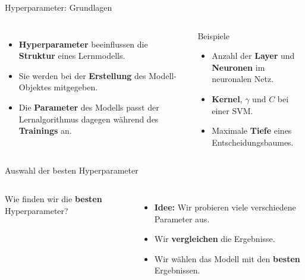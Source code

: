 

\begin{frame}{Hyperparameter: Grundlagen}
\begin{columns}
\begin{itemize}
  \item \textbf{Hyperparameter} beeinflussen die \textbf{Struktur} eines
        Lernmodells.
  \item Sie werden bei der \textbf{Erstellung} des Modell-Objektes
        mitgegeben.
  \item Die \textbf{Parameter} des Modells passt der Lernalgorithmus
        dagegen während des \textbf{Trainings} an.
\end{itemize}

\begin{blockC1}{Beispiele}
\begin{itemize}
  \item Anzahl der \textbf{Layer} und \textbf{Neuronen} im neuronalen Netz.
  \item \textbf{Kernel}, $\gamma$ und $C$ bei einer SVM.
  \item Maximale \textbf{Tiefe} eines Entscheidungsbaumes.
\end{itemize}
\end{blockC1}
\end{columns}
\end{frame}


\begin{frame}{Auswahl der besten Hyperparameter}
\begin{columns}
\centering
{}

Wie finden wir die \textbf{besten} Hyperparameter?

\vspace{0.4em}
\begin{itemize}
  \item \textbf{Idee:} Wir probieren viele verschiedene Parameter aus.
  \item Wir \textbf{vergleichen} die Ergebnisse.
  \item Wir wählen das Modell mit den \textbf{besten} Ergebnissen.
\end{itemize}
\end{columns}
\end{frame}

